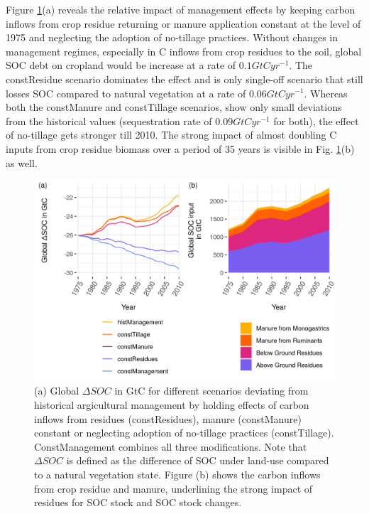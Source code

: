 \documentclass[gc, manuscript]{copernicus}
\begin{document}
Figure \ref{fig:SOCscen}(a) reveals the relative impact of management effects by keeping carbon inflows from crop residue returning or manure application constant at the level of 1975 and neglecting the adoption of no-tillage practices. Without changes in management regimes, especially in C inflows from crop residues to the soil, global SOC debt on cropland would be increase at a rate of \(0.1\unit{GtC yr^{-1}}\). The constResidue scenario dominates the effect and is only single-off scenario that still losses SOC compared to natural vegetation at a rate of \(0.06\unit{GtC yr^{-1}}\). Whereas both the constManure and constTillage scenarios, show only small deviations from the historical values (sequestration rate of \(0.09\unit{GtC yr^{-1}}\) for both), the effect of no-tillage gets stronger till 2010.
The strong impact of almost doubling C inputs from crop residue biomass over a period of 35 years is visible in Fig. \ref{fig:SOCscen}(b) as well.

\begin{figure}[h]
\includegraphics[width=18cm]{../ResultNotebooks/Output/Images/scenario_horiz} \caption{(a) Global $\Delta SOC$ in GtC for different scenarios deviating from historical argicultural management by holding effects of carbon inflows from residues (constResidues), manure (constManure) constant or neglecting adoption of no-tillage practices (constTillage). ConstManagement combines all three modifications. Note that $\Delta SOC$ is defined as the difference of SOC under land-use compared to a natural vegetation state. Figure (b) shows the carbon inflows from crop residue and manure, underlining the strong impact of residues for SOC stock and SOC stock changes.}\label{fig:SOCscen}
\end{figure}
\end{document}

